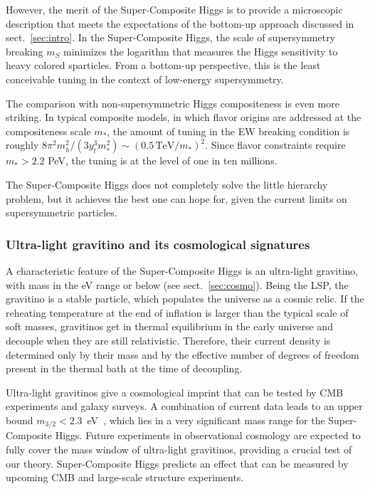 \documentclass[a4paper,12pt]{article}
\newcommand{\tev}{\textrm{TeV}}
\def\sec#1{sect.~\ref{#1}}
\def\mS{m_S}
\def\mgra{m_{3/2}}
\begin{document}
{{{{However, the merit of the Super-Composite Higgs is to provide a microscopic description that meets the expectations of the bottom-up approach discussed in \sec{sec:intro}. In the Super-Composite Higgs, the scale of supersymmetry breaking $\mS$ minimizes the logarithm that measures the Higgs sensitivity to heavy colored sparticles. From a bottom-up perspective, this is the least conceivable tuning in the context of low-energy supersymmetry. 

The comparison with non-supersymmetric Higgs compositeness is even more striking. In typical composite models, in which flavor origins are addressed  at the compositeness scale $m_*$, the amount of tuning in the EW breaking condition is roughly $8\pi^2 m_h^2/(3 y_t^3 m_*^2)\sim (0.5\, \tev/m_*)^2$. Since flavor constraints require $m_*> 2.2$ PeV, the tuning is at the level of one in ten millions.

The Super-Composite Higgs does not completely solve the little hierarchy problem, but it achieves the best one can hope for, given the current limits on supersymmetric particles.


\subsubsection*{Ultra-light gravitino and its cosmological signatures}

A characteristic feature of the Super-Composite Higgs is an ultra-light gravitino, with mass in the eV range or below (see \sec{sec:cosmo}). Being the LSP, the gravitino is a stable particle, which populates the universe as a cosmic relic. If the reheating temperature at the end of inflation is larger than the typical scale of soft masses, gravitinos get in thermal equilibrium in the early universe and decouple when they are still relativistic. Therefore, their current density is determined only by their mass and by the effective number of degrees of freedom present in the thermal bath at the time of decoupling. 

Ultra-light gravitinos give a cosmological imprint that can be tested by CMB experiments and galaxy surveys. A combination of current data leads to an upper bound $\mgra <2.3$~eV~\cite{Xu:2021rwg}, which lies in a very significant mass range for the Super-Composite Higgs. Future experiments in observational cosmology are expected to fully cover the mass window of ultra-light gravitinos, providing a crucial test of our theory. Super-Composite Higgs predicts an effect that can be measured by upcoming CMB and large-scale structure experiments.

}}}}
\end{document}
